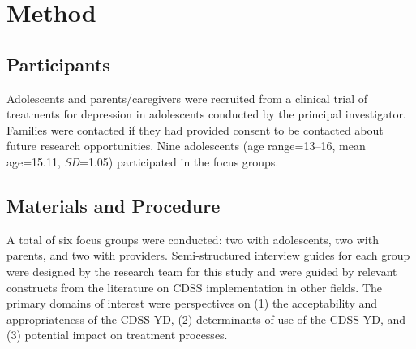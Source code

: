 \section{Method}

\subsection{Participants}
Adolescents and parents/caregivers were recruited from
a clinical trial of treatments for depression in adolescents
conducted by the principal investigator. Families were
contacted if they had provided consent to be contacted
about future research opportunities. Nine adolescents
(age range=13–16, mean age=15.11, \textit{SD}=1.05) participated in the focus groups.
\subsection{Materials and Procedure}
A total of six focus groups were conducted: two with adolescents, two with parents, and two with providers. Semi-structured interview guides for each group were designed
by the research team for this study and were guided by
relevant constructs from the literature on CDSS implementation in other fields. The primary domains of
interest were perspectives on (1) the acceptability and
appropriateness of the CDSS-YD, (2) determinants of use
of the CDSS-YD, and (3) potential impact on treatment
processes.